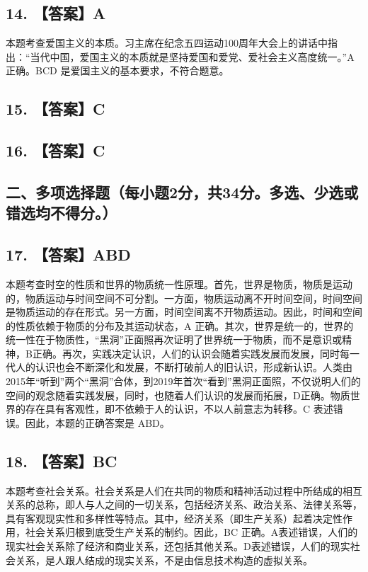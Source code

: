 \documentclass[UTF8,11pt]{ctexart}
\begin{document}
\subsection*{14. 【答案】A}

本题考查爱国主义的本质。习主席在纪念五四运动100周年大会上的讲话中指出：“当代中国，爱国主义的本质就是坚持爱国和爱党、爱社会主义高度统一。”A 正确。BCD 是爱国主义的基本要求，不符合题意。


\subsection*{15. 【答案】C}

\subsection*{16. 【答案】C}

\subsection*{二、多项选择题（每小题2分，共34分。多选、少选或错选均不得分。）}

\subsection*{17. 【答案】ABD}

本题考查时空的性质和世界的物质统一性原理。首先，世界是物质，物质是运动的，物质运动与时间空间不可分割。一方面，物质运动离不开时间空间，时间空间是物质运动的存在形式。另一方面，时间空间离不开物质运动。因此，时间和空间的性质依赖于物质的分布及其运动状态，A 正确。其次，世界是统一的，世界的统一性在于物质性，“黑洞”正面照再次证明了世界统一于物质，而不是意识或精神，B正确。再次，实践决定认识，人们的认识会随着实践发展而发展，同时每一代人的认识也会不断深化和发展，不断打破前人的旧认识，形成新认识。人类由2015年“听到”两个“黑洞”合体，到2019年首次“看到”黑洞正面照，不仅说明人们的空间的观念随着实践发展，同时，也随着人们认识的发展而拓展，D正确。物质世界的存在具有客观性，即不依赖于人的认识，不以人前意志为转移。C 表述错误。因此，本题的正确答案是 ABD。


\subsection*{18. 【答案】BC}

本题考查社会关系。社会关系是人们在共同的物质和精神活动过程中所结成的相互关系的总称，即人与人之间的一切关系，包括经济关系、政治关系、法律关系等，具有客观现实性和多样性等特点。其中，经济关系（即生产关系）起着决定性作用，社会关系归根到底受生产关系的制约。因此，BC 正确。A表述错误，人们的现实社会关系除了经济和商业关系，还包括其他关系。D表述错误，人们的现实社会关系，是人跟人结成的现实关系，不是由信息技术构造的虚拟关系。
\end{document}
